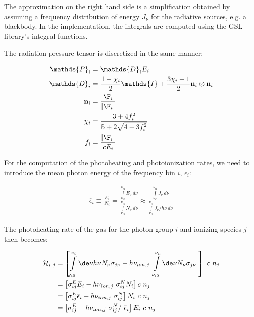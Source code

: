 The approximation on the right hand side is a simplification obtained by assuming
a frequency distribution of energy $J_{\nu}$ for the radiative sources, e.g. a blackbody.
In the implementation, the integrals are computed using the GSL library's integral
functions.

The radiation pressure tensor is discretized in the same manner:


\begin{align}
	\mathds{P}_i &=
        \mathds{D}_i E_i \label{eq:pressure-tensor-group-start}\\
	\mathds{D}_i &=
        \frac{1- \chi_i}{2} \mathds{I} + \frac{3 \chi_i - 1}{2} \mathbf{n}_i \otimes \mathbf{n}_i \label{eq:eddington-group} \\
	\mathbf{n}_i &=
        \frac{\F_i}{|\F_i|} \\
	\chi_i &=
        \frac{3 + 4 f_i ^2}{5 + 2 \sqrt{4 - 3 f_i^2}} \\
	f_i &=
        \frac{|\F_i|}{c E_i} \label{eq:pressure-tensor-group-end}
\end{align}




For the computation of the  photoheating and photoionization rates, we need to introduce the mean 
photon energy of the frequency bin $i$, $\overline{\epsilon}_i$:

\begin{align}
\overline{\epsilon}_i \equiv 
    \frac{E_i}{N_i} = 
    \frac{
        \int\limits_{\nu_{i0}}^{\nu_{i1}} E_\nu \ d\nu
        }{
        \int\limits_{\nu_{i0}}^{\nu_{i1}} N_\nu \ d\nu
        }  
    \approx
    \frac{
        \int\limits_{\nu_{i0}}^{\nu_{i1}} J_\nu \ d\nu
        }{
        \int\limits_{\nu_{i0}}^{\nu_{i1}} J_\nu / h\nu \ d\nu
        }
\end{align}

The photoheating rate of the gas for the photon group $i$ and ionizing species $j$ then becomes:

\begin{align}
\mathcal{H}_{i, j} &=
\left[
		\int\limits_{\nu_{i0}}^{\nu_{i1}}\de \nu h \nu N_\nu  \sigma_{j\nu} -
	h \nu_{ion,j}\
		\int\limits_{\nu_{i0}}^{\nu_{i1}}\de \nu N_\nu \sigma_{j\nu} \
\right] \ c \ n_j \\
%
&=
\left[
	\sigma_{ij}^E E_i - h \nu_{ion,j}\ \sigma_{ij}^N N_i
\right]  c \ n_j \\
&=
\left[
	\sigma_{ij}^E \overline{\epsilon}_i - h \nu_{ion,j}\ \sigma_{ij}^N
\right]  N_i\ c \ n_j \\
&=
\left[
	\sigma_{ij}^E  - h \nu_{ion,j}\ \sigma_{ij}^N /\ \overline{\epsilon}_i
\right]  E_i\ c \ n_j
\end{align}



